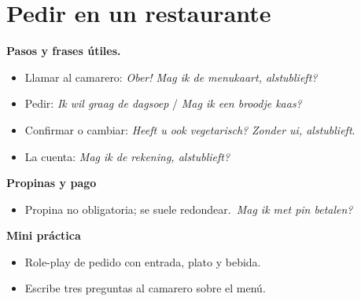 \section{Pedir en un restaurante}
\textbf{Pasos y frases útiles.}
\begin{itemize}[leftmargin=*]
  \item Llamar al camarero: \textit{Ober! Mag ik de menukaart, alstublieft?}
  \item Pedir: \textit{Ik wil graag de dagsoep} / \textit{Mag ik een broodje kaas?}
  \item Confirmar o cambiar: \textit{Heeft u ook vegetarisch?} \textit{Zonder ui, alstublieft}.
  \item La cuenta: \textit{Mag ik de rekening, alstublieft?}
\end{itemize}

\textbf{Propinas y pago}
\begin{itemize}[leftmargin=*]
  \item Propina no obligatoria; se suele redondear.\ \textit{Mag ik met pin betalen?}
\end{itemize}

\textbf{Mini práctica}
\begin{itemize}[leftmargin=*]
  \item Role-play de pedido con entrada, plato y bebida.
  \item Escribe tres preguntas al camarero sobre el menú.
\end{itemize}
